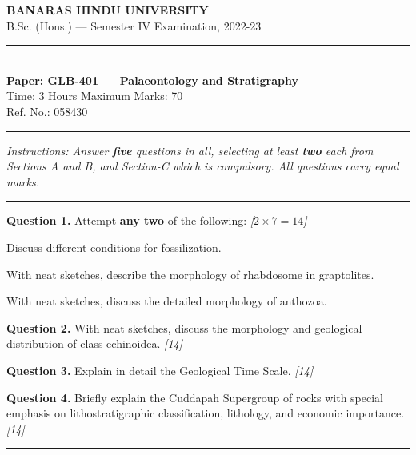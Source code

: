 \documentclass[11pt,a4paper]{article}
\newcommand{\pts}[1]{\hfill   \textit{[#1]}}
\begin{document}
\begin{center}
  {\large\bfseries BANARAS HINDU UNIVERSITY}\\[2pt]
  {\normalsize B.Sc. (Hons.) --- Semester IV Examination, 2022-23}\\[6pt]
  \rule{0.8\linewidth}{0.5pt}\\[6pt]
  {\large\bfseries Paper: GLB-401 --- Palaeontology and Stratigraphy}\\[4pt]
  {\normalsize Time: 3 Hours \hfill Maximum Marks: 70}\\[2pt]
  {\small Ref. No.: 058430}
\end{center}
\rule{\linewidth}{0.4pt}
\smallskip



\noindent   \textit{Instructions: Answer   \textbf{five} questions in all, selecting at least   \textbf{two} each from Sections A and B, and Section-C which is compulsory. All questions carry equal marks.}
\bigskip

\bigskip


\rule{\linewidth}{0.4pt}\smallskip




\noindent   \textbf{Question 1.} Attempt   \textbf{any two} of the following: \pts{$2  \times 7 = 14$}

\begin{parts}
  \item Discuss different conditions for fossilization.
  \item With neat sketches, describe the morphology of rhabdosome in graptolites.
  \item With neat sketches, discuss the detailed morphology of anthozoa.
\end{parts}

\medskip


\noindent   \textbf{Question 2.} With neat sketches, discuss the morphology and geological distribution of class echinoidea. \pts{14}

\medskip


\noindent   \textbf{Question 3.} Explain in detail the Geological Time Scale. \pts{14}

\medskip


\noindent   \textbf{Question 4.} Briefly explain the Cuddapah Supergroup of rocks with special emphasis on lithostratigraphic classification, lithology, and economic importance. \pts{14}

\bigskip


\rule{\linewidth}{0.4pt}\smallskip
\end{document}

